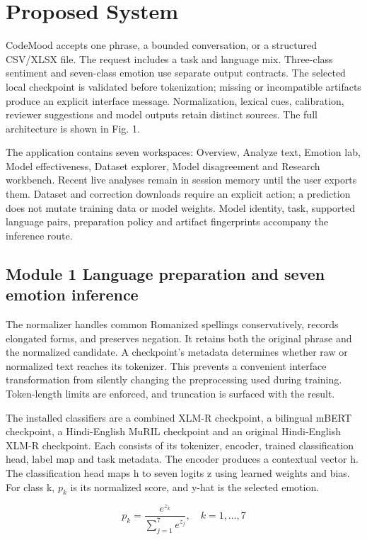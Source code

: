 \documentclass[conference]{IEEEtran}
\begin{document}
\section{Proposed System}

CodeMood accepts one phrase, a bounded conversation, or a structured CSV/XLSX file. The request includes a task and language mix. Three-class sentiment and seven-class emotion use separate output contracts. The selected local checkpoint is validated before tokenization; missing or incompatible artifacts produce an explicit interface message. Normalization, lexical cues, calibration, reviewer suggestions and model outputs retain distinct sources. The full architecture is shown in Fig. 1.

The application contains seven workspaces: Overview, Analyze text, Emotion lab, Model effectiveness, Dataset explorer, Model disagreement and Research workbench. Recent live analyses remain in session memory until the user exports them. Dataset and correction downloads require an explicit action; a prediction does not mutate training data or model weights. Model identity, task, supported language pairs, preparation policy and artifact fingerprints accompany the inference route.

\subsection{Module 1 Language preparation and seven emotion inference}

The normalizer handles common Romanized spellings conservatively, records elongated forms, and preserves negation. It retains both the original phrase and the normalized candidate. A checkpoint's metadata determines whether raw or normalized text reaches its tokenizer. This prevents a convenient interface transformation from silently changing the preprocessing used during training. Token-length limits are enforced, and truncation is surfaced with the result.

The installed classifiers are a combined XLM-R checkpoint, a bilingual mBERT checkpoint, a Hindi-English MuRIL checkpoint and an original Hindi-English XLM-R checkpoint. Each consists of its tokenizer, encoder, trained classification head, label map and task metadata. The encoder produces a contextual vector h. The classification head maps h to seven logits z using learned weights and bias. For class k, \(p_k\) is its normalized score, and y-hat is the selected emotion.

\begin{equation}
p_k=\frac{e^{z_k}}{\sum_{j=1}^{7}e^{z_j}},\quad k=1,\ldots,7
\label{eq:softmax}
\end{equation}
\end{document}
